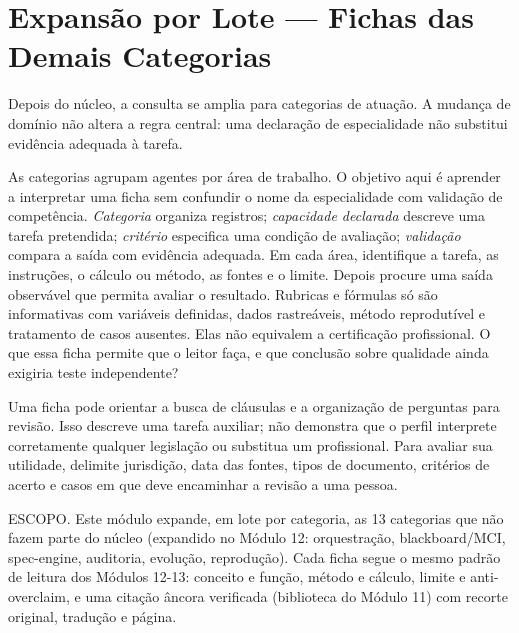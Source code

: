 
\chapter{Expansão por Lote — Fichas das Demais Categorias}

Depois do núcleo, a consulta se amplia para categorias de atuação. A mudança de domínio não altera a regra central: uma declaração de especialidade não substitui evidência adequada à tarefa.

\label{mod14}

\roteirodidatico
{As categorias agrupam agentes por área de trabalho. O objetivo aqui é aprender a interpretar uma ficha sem confundir o nome da especialidade com validação de competência.}
{\emph{Categoria} organiza registros; \emph{capacidade declarada} descreve uma tarefa pretendida; \emph{critério} especifica uma condição de avaliação; \emph{validação} compara a saída com evidência adequada.}
{Em cada área, identifique a tarefa, as instruções, o cálculo ou método, as fontes e o limite. Depois procure uma saída observável que permita avaliar o resultado.}
{Rubricas e fórmulas só são informativas com variáveis definidas, dados rastreáveis, método reprodutível e tratamento de casos ausentes. Elas não equivalem a certificação profissional.}
{O que essa ficha permite que o leitor faça, e que conclusão sobre qualidade ainda exigiria teste independente?}

{Uma ficha pode orientar a busca de cláusulas e a organização de perguntas para revisão. Isso descreve uma tarefa auxiliar; não demonstra que o perfil interprete corretamente qualquer legislação ou substitua um profissional. Para avaliar sua utilidade, delimite jurisdição, data das fontes, tipos de documento, critérios de acerto e casos em que deve encaminhar a revisão a uma pessoa.}

\begin{resultado}
ESCOPO. Este módulo expande, em lote por categoria, as 13 categorias que não
fazem parte do núcleo (expandido no Módulo 12: orquestração, blackboard/MCI,
spec-engine, auditoria, evolução, reprodução). Cada ficha segue o mesmo padrão
de leitura dos Módulos 12-13: conceito e função, método e cálculo, limite e
anti-overclaim, e uma citação âncora verificada (biblioteca do Módulo 11) com
recorte original, tradução e página.
\end{resultado}

